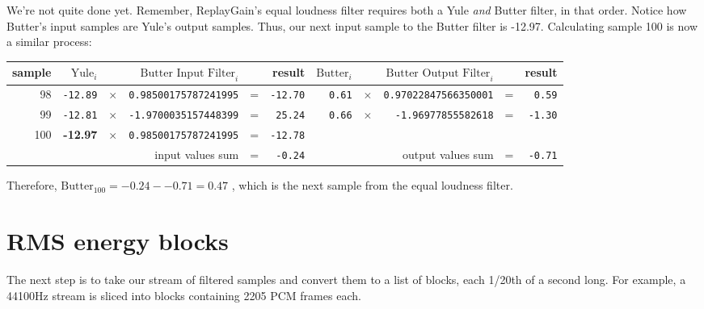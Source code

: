 We're not quite done yet.
Remember, ReplayGain's equal loudness filter requires both
a Yule \textit{and} Butter filter, in that order.
Notice how Butter's input samples are Yule's output samples.
Thus, our next input sample to the Butter filter is -12.97.
Calculating sample 100 is now a similar process:
\begin{table}[h]
{
\begin{tabular}{|r|rcrcr|rcrcr|}
\hline
sample & $\text{Yule}_i$ & & $\text{Butter Input Filter}_i$ & & result &
$\text{Butter}_i$ & & $\text{Butter Output Filter}_i$ & & result \\
\hline
98 & \texttt{-12.89} & $\times$ & \texttt{0.98500175787241995} & = & \texttt{-12.70} &
\texttt{0.61} & $\times$ & \texttt{0.97022847566350001} & = & \texttt{0.59} \\

99 & \texttt{-12.81} & $\times$ & \texttt{-1.9700035157448399} & = & \texttt{25.24} &
\texttt{0.66} & $\times$ & \texttt{-1.96977855582618} & = & \texttt{-1.30} \\

100 & \textbf{-12.97} & $\times$ & \texttt{0.98500175787241995} & = & \texttt{-12.78} &
& & & & \\
\hline
\multicolumn{4}{|r}{input values sum} & = & \texttt{-0.24} &
\multicolumn{3}{r}{output values sum} & = & \texttt{-0.71} \\
\hline
\end{tabular}
}
\end{table}
\par
\noindent
Therefore, $\text{Butter}_{100} = -0.24 - -0.71 = 0.47$
, which is the next sample from the equal loudness filter.

\pagebreak

\section{RMS energy blocks}
The next step is to take our stream of filtered samples and convert
them to a list of blocks, each 1/20th of a second long.
For example, a 44100Hz stream is sliced into blocks containing
2205 PCM frames each.

